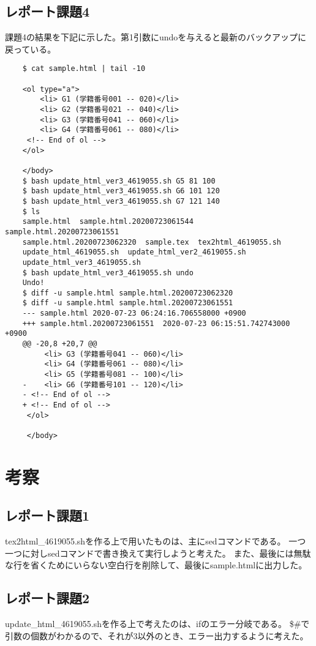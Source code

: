 \documentclass[12pt]{jarticle}
\begin{document}
\subsection{レポート課題4}
課題4の結果を下記に示した。第1引数にundoを与えると最新のバックアップに戻っている。
\begin{lstlisting}
    $ cat sample.html | tail -10

    <ol type="a">
        <li> G1 (学籍番号001 -- 020)</li>
        <li> G2 (学籍番号021 -- 040)</li>
        <li> G3 (学籍番号041 -- 060)</li>
        <li> G4 (学籍番号061 -- 080)</li>
     <!-- End of ol -->
    </ol>

    </body>
    $ bash update_html_ver3_4619055.sh G5 81 100
    $ bash update_html_ver3_4619055.sh G6 101 120
    $ bash update_html_ver3_4619055.sh G7 121 140
    $ ls 
    sample.html  sample.html.20200723061544  sample.html.20200723061551  
    sample.html.20200723062320  sample.tex  tex2html_4619055.sh  
    update_html_4619055.sh  update_html_ver2_4619055.sh  
    update_html_ver3_4619055.sh
    $ bash update_html_ver3_4619055.sh undo
    Undo!
    $ diff -u sample.html sample.html.20200723062320
    $ diff -u sample.html sample.html.20200723061551
    --- sample.html	2020-07-23 06:24:16.706558000 +0900
    +++ sample.html.20200723061551	2020-07-23 06:15:51.742743000 +0900
    @@ -20,8 +20,7 @@
         <li> G3 (学籍番号041 -- 060)</li>
         <li> G4 (学籍番号061 -- 080)</li>
         <li> G5 (学籍番号081 -- 100)</li>
    -    <li> G6 (学籍番号101 -- 120)</li>
    - <!-- End of ol -->
    + <!-- End of ol -->
     </ol>
    
     </body>
\end{lstlisting}

\section{考察}
\subsection{レポート課題1}
tex2html\_4619055.shを作る上で用いたものは、主にsedコマンドである。
一つ一つに対しsedコマンドで書き換えて実行しようと考えた。
また、最後には無駄な行を省くためにいらない空白行を削除して、最後にsample.htmlに出力した。
\subsection{レポート課題2}
update\_html\_4619055.shを作る上で考えたのは、ifのエラー分岐である。
\$\#で引数の個数がわかるので、それが3以外のとき、エラー出力するように考えた。
\end{document}
